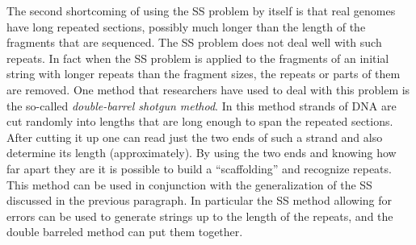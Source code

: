 \begin{gram}
The second shortcoming of using the SS problem by itself is that real
genomes have long repeated sections, possibly much longer than the
length of the fragments that are sequenced.  The SS problem does not
deal well with such repeats.  In fact when the SS problem is applied
to the fragments of an initial string with longer repeats than the
fragment sizes, the repeats or parts of them are removed.  One method
that researchers have used to deal with this problem is the so-called
\emph{double-barrel shotgun method}.  In this method strands of DNA
are cut randomly into lengths that are long enough to span the
repeated sections.  After cutting it up one can read just the two ends
of such a strand and also determine its length (approximately).  By
using the two ends and knowing how far apart they are it is possible
to build a ``scaffolding'' and recognize repeats.  This method can be
used in conjunction with the generalization of the SS discussed in the
previous paragraph.  In particular the SS method allowing for errors
can be used to generate strings up to the length of the repeats, and
the double barreled method can put them together.
\end{gram}

